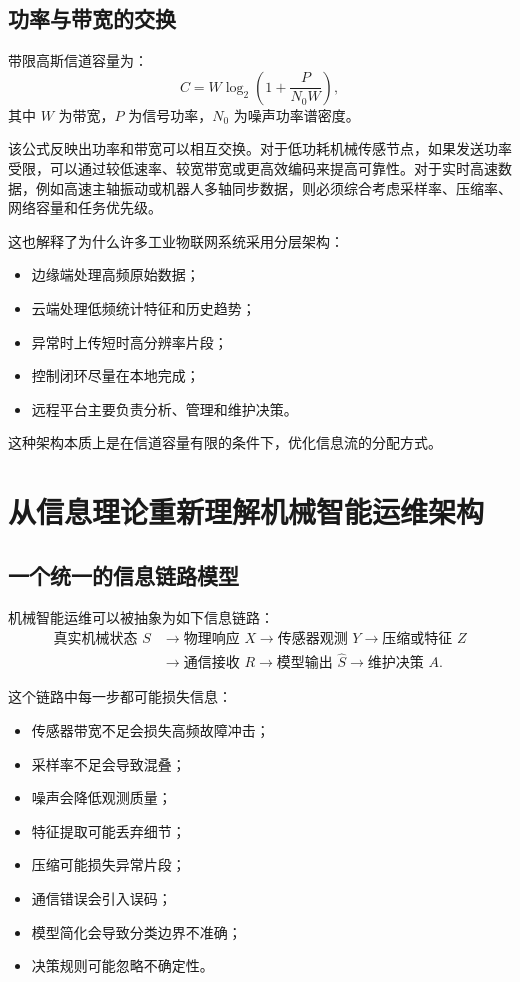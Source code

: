 \documentclass[UTF8,a4paper,12pt]{ctexart}
\begin{document}
\subsection{功率与带宽的交换}

带限高斯信道容量为：
\begin{equation}
C=W\log_2\left(1+\frac{P}{N_0W}\right),
\end{equation}
其中 $W$ 为带宽，$P$ 为信号功率，$N_0$ 为噪声功率谱密度。

该公式反映出功率和带宽可以相互交换。对于低功耗机械传感节点，如果发送功率受限，可以通过较低速率、较宽带宽或更高效编码来提高可靠性。对于实时高速数据，例如高速主轴振动或机器人多轴同步数据，则必须综合考虑采样率、压缩率、网络容量和任务优先级。

这也解释了为什么许多工业物联网系统采用分层架构：
\begin{itemize}
  \item 边缘端处理高频原始数据；
  \item 云端处理低频统计特征和历史趋势；
  \item 异常时上传短时高分辨率片段；
  \item 控制闭环尽量在本地完成；
  \item 远程平台主要负责分析、管理和维护决策。
\end{itemize}

这种架构本质上是在信道容量有限的条件下，优化信息流的分配方式。

\section{从信息理论重新理解机械智能运维架构}

\subsection{一个统一的信息链路模型}

机械智能运维可以被抽象为如下信息链路：
\[
\begin{aligned}
\text{真实机械状态 }S
&\rightarrow \text{物理响应 }X
\rightarrow \text{传感器观测 }Y
\rightarrow \text{压缩或特征 }Z \\
&\rightarrow \text{通信接收 }R
\rightarrow \text{模型输出 }\hat S
\rightarrow \text{维护决策 }A.
\end{aligned}
\]

这个链路中每一步都可能损失信息：
\begin{itemize}
  \item 传感器带宽不足会损失高频故障冲击；
  \item 采样率不足会导致混叠；
  \item 噪声会降低观测质量；
  \item 特征提取可能丢弃细节；
  \item 压缩可能损失异常片段；
  \item 通信错误会引入误码；
  \item 模型简化会导致分类边界不准确；
  \item 决策规则可能忽略不确定性。
\end{itemize}
\end{document}
